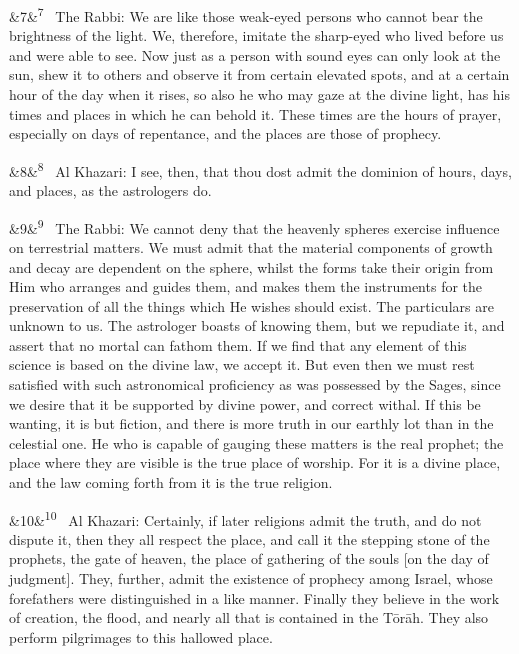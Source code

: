 \documentclass[12pt]{article}
\newcommand{\para}[1][]{\par\noindent\ifx&#1&\else\textsuperscript{\footnotesize #1}~\fi}
\begin{document}
\para[7] The Rabbi: We are like those weak-eyed persons who cannot bear the brightness of the light. We, therefore, imitate the sharp-eyed who lived before us and were able to see. Now just as a person with sound eyes can only look at the sun, shew it to others and observe it from certain elevated spots, and at a certain hour of the day when it rises, so also he who may gaze at the divine light, has his times and places in which he can behold it. These times are the hours of prayer, especially on days of repentance, and the places are those of prophecy.

\para[8] Al Khazari: I see, then, that thou dost admit the dominion of hours, days, and places, as the astrologers do.

\para[9] The Rabbi: We cannot deny that the heavenly spheres exercise influence on terrestrial matters. We must admit that the material components of growth and decay are dependent on the sphere, whilst the forms take their origin from Him who arranges and guides them, and makes them the instruments for the preservation of all the things which He wishes should exist. The particulars are unknown to us. The astrologer boasts of knowing them, but we repudiate it, and assert that no mortal can fathom them. If we find that any element of this science is based on the divine law, we accept it. But even then we must rest satisfied with such astronomical proficiency as was possessed by the Sages, since we desire that it be supported by divine power, and correct withal. If this be wanting, it is but fiction, and there is more truth in our earthly lot than in the celestial one. He who is capable of gauging these matters is the real prophet; the place where they are visible is the true place of worship. For it is a divine place, and the law coming forth from it is the true religion.

\para[10] Al Khazari: Certainly, if later religions admit the truth, and do not dispute it, then they all respect the place, and call it the stepping stone of the prophets, the gate of heaven, the place of gathering of the souls [on the day of judgment]. They, further, admit the existence of prophecy among Israel, whose forefathers were distinguished in a like manner. Finally they believe in the work of creation, the flood, and nearly all that is contained in the Tōrāh. They also perform pilgrimages to this hallowed place.
\end{document}
